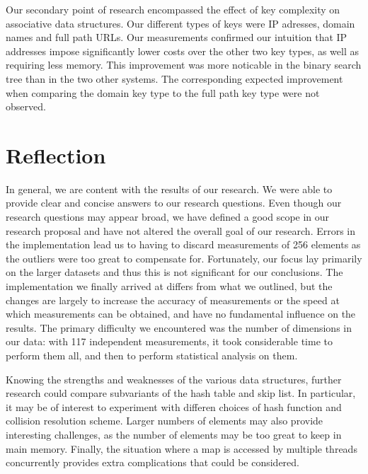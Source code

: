 \documentclass[12pt,a4paper]{article}
\begin{document}
    Our secondary point of research encompassed the effect of key complexity on associative data
    structures.  Our different types of keys were IP adresses, domain names and full path URLs.  Our
    measurements confirmed our intuition that IP addresses impose significantly lower costs over the
    other two key types, as well as requiring less memory.  This improvement was more noticable in
    the binary search tree than in the two other systems.  The corresponding expected improvement
    when comparing the domain key type to the full path key type were not observed.


    \section{Reflection}
    In general, we are content with the results of our research. We were able to provide clear and
    concise answers to our research questions. Even though our research questions may appear broad,
    we have defined a good scope in our research proposal and have not altered the overall goal
    of our research.  Errors in the implementation lead us to having to discard measurements of 256
    elements as the outliers were too great to compensate for.  Fortunately, our focus lay primarily
    on the larger datasets and thus this is not significant for our conclusions.  The implementation
    we finally arrived at differs from what we outlined, but the changes are largely to increase the
    accuracy of measurements or the speed at which measurements can be obtained, and have no
    fundamental influence on the results.  The primary difficulty we encountered was the number of
    dimensions in our data: with 117 independent measurements, it took considerable time to perform
    them all, and then to perform statistical analysis on them.

    Knowing the strengths and weaknesses of the various data structures, further research could
    compare subvariants of the hash table and skip list.  In particular, it may be of interest to
    experiment with differen choices of hash function and collision resolution scheme.  Larger
    numbers of elements may also provide interesting challenges, as the number of elements may be
    too great to keep in main memory.  Finally, the situation where a map is accessed by multiple
    threads concurrently provides extra complications that could be considered.

    

    
\end{document}
